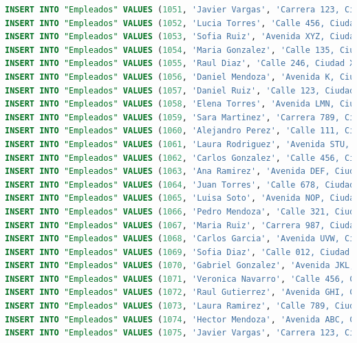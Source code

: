\documentclass[12pt]{article}
\begin{document}
\begin{lstlisting}[language=SQL]
INSERT INTO "Empleados" VALUES (1051, 'Javier Vargas', 'Carrera 123, Ciudad A', '555-4567', 'Promotor');
INSERT INTO "Empleados" VALUES (1052, 'Lucia Torres', 'Calle 456, Ciudad XYZ', '555-5678', 'Electromecanico');
INSERT INTO "Empleados" VALUES (1053, 'Sofia Ruiz', 'Avenida XYZ, Ciudad XYZ', '555-6789', 'Gerente');
INSERT INTO "Empleados" VALUES (1054, 'Maria Gonzalez', 'Calle 135, Ciudad A', '555-7890', 'Asesor');
INSERT INTO "Empleados" VALUES (1055, 'Raul Diaz', 'Calle 246, Ciudad XYZ', '555-8901', 'Mecanico');
INSERT INTO "Empleados" VALUES (1056, 'Daniel Mendoza', 'Avenida K, Ciudad A', '555-9012', 'Promotor');
INSERT INTO "Empleados" VALUES (1057, 'Daniel Ruiz', 'Calle 123, Ciudad XYZ', '555-0123', 'Promotor');
INSERT INTO "Empleados" VALUES (1058, 'Elena Torres', 'Avenida LMN, Ciudad XYZ', '555-1234', 'Promotor');
INSERT INTO "Empleados" VALUES (1059, 'Sara Martinez', 'Carrera 789, Ciudad P', '555-2345', 'Promotor');
INSERT INTO "Empleados" VALUES (1060, 'Alejandro Perez', 'Calle 111, Ciudad XYZ', '555-3456', 'Electromecanico');
INSERT INTO "Empleados" VALUES (1061, 'Laura Rodriguez', 'Avenida STU, Ciudad A', '555-4567', 'Gerente');
INSERT INTO "Empleados" VALUES (1062, 'Carlos Gonzalez', 'Calle 456, Ciudad XYZ', '555-5678', 'Asesor');
INSERT INTO "Empleados" VALUES (1063, 'Ana Ramirez', 'Avenida DEF, Ciudad XYZ', '555-6789', 'Mecanico');
INSERT INTO "Empleados" VALUES (1064, 'Juan Torres', 'Calle 678, Ciudad A', '555-7890', 'Promotor');
INSERT INTO "Empleados" VALUES (1065, 'Luisa Soto', 'Avenida NOP, Ciudad XYZ', '555-8901', 'Promotor');
INSERT INTO "Empleados" VALUES (1066, 'Pedro Mendoza', 'Calle 321, Ciudad A', '555-9012', 'Promotor');
INSERT INTO "Empleados" VALUES (1067, 'Maria Ruiz', 'Carrera 987, Ciudad XYZ', '555-0123', 'Electromecanico');
INSERT INTO "Empleados" VALUES (1068, 'Carlos Garcia', 'Avenida UVW, Ciudad P', '555-1234', 'Gerente');
INSERT INTO "Empleados" VALUES (1069, 'Sofia Diaz', 'Calle 012, Ciudad XYZ', '555-2345', 'Asesor');
INSERT INTO "Empleados" VALUES (1070, 'Gabriel Gonzalez', 'Avenida JKL, Ciudad A', '555-3456', 'Mecanico');
INSERT INTO "Empleados" VALUES (1071, 'Veronica Navarro', 'Calle 456, Ciudad XYZ', '555-4567', 'Promotor');
INSERT INTO "Empleados" VALUES (1072, 'Raul Gutierrez', 'Avenida GHI, Ciudad XYZ', '555-5678', 'Promotor');
INSERT INTO "Empleados" VALUES (1073, 'Laura Ramirez', 'Calle 789, Ciudad A', '555-6789', 'Promotor');
INSERT INTO "Empleados" VALUES (1074, 'Hector Mendoza', 'Avenida ABC, Ciudad XYZ', '555-7890', 'Electromecanico');
INSERT INTO "Empleados" VALUES (1075, 'Javier Vargas', 'Carrera 123, Ciudad A', '555-8901', 'Gerente');

\end{lstlisting}
\end{document}
